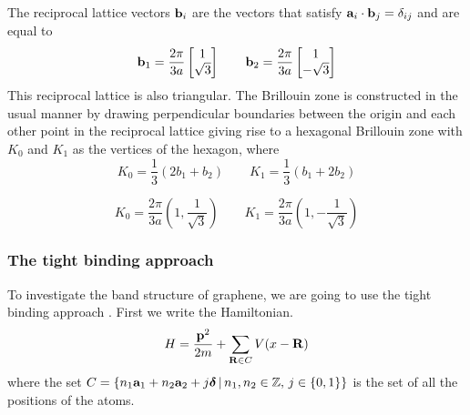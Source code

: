 The reciprocal lattice vectors $\mathbf{b}_i$ are the vectors that satisfy $\mathbf{a}_i\cdot \mathbf{b}_j=\delta_{ij}$ and are equal to 
\begin{equation}
    \mathbf{b}_1=\frac{2\pi}{3a}\begin{bmatrix}
        1 \\ \sqrt 3
    \end{bmatrix}
    \quad \quad
    \mathbf{b}_2=\frac{2\pi}{3a}\begin{bmatrix}
        1 \\ -\sqrt 3
    \end{bmatrix}
\end{equation}
This reciprocal lattice is also triangular. The Brillouin zone is constructed in the usual manner by drawing perpendicular boundaries between the origin and each other point in the reciprocal lattice giving rise to a hexagonal Brillouin zone with $K_0$ and $K_1$ as the vertices of the hexagon, where 
\[
    K_0=\frac 13 (2b_1+b_2)\quad \quad K_1=\frac 13 (b_1+2b_2)
\]

\begin{equation}
    K_0=\frac{2\pi}{3a}\left(1,\frac 1{\sqrt 3}\right)\quad\quad K_1=\frac{2\pi}{3a}\left(1,-\frac 1{\sqrt 3}\right)
\end{equation}

\subsubsection*{The tight binding approach}
To investigate the band structure of graphene, we are going to use the tight binding approach \cite{bloch1929quantenmechanik}.
First we write the Hamiltonian.
\begin{equation}
    H=\frac{\mathbf{p}^2}{2m} + \sum_{\mathbf{R}\in C}V(x-\mathbf{R})
    \label{eq:blochhamiltonian}
\end{equation}
where the set $C=\left\{n_1\mathbf{a}_1 +n_2\mathbf{a}_2 + j\boldsymbol \delta\,|\,n_1,n_2\in \mathbb Z,\, j\in \{0,1\} \right\}$ is the set of all the positions of the atoms.

